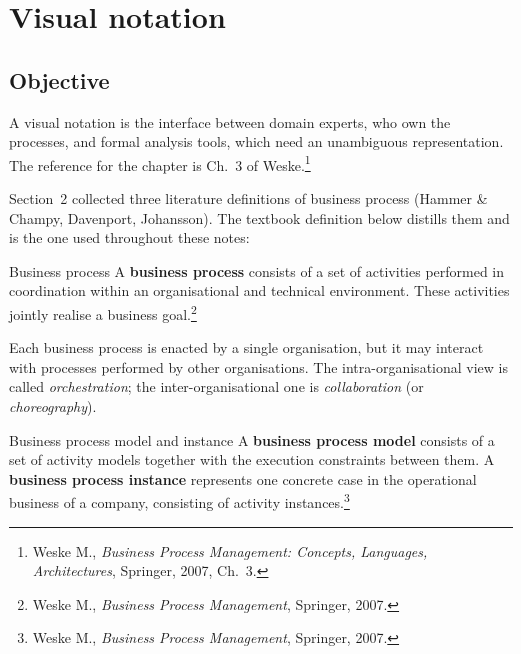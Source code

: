 \section{Visual notation}


\subsection{Objective}

A visual notation is the interface between domain experts, who own the processes, and formal analysis tools, which need an unambiguous representation. The reference for the chapter is Ch.~3 of Weske.\footnote{Weske M., \emph{Business Process Management: Concepts, Languages, Architectures}, Springer, 2007, Ch.~3.}

Section~2 collected three literature definitions of business process (Hammer \& Champy, Davenport, Johansson). The textbook definition below distills them and is the one used throughout these notes:

\begin{definitionbox}{Business process}
A \textbf{business process} consists of a set of activities performed in coordination within an organisational and technical environment. These activities jointly realise a business goal.\footnote{Weske M., \emph{Business Process Management}, Springer, 2007.}
\end{definitionbox}

Each business process is enacted by a single organisation, but it may interact with processes performed by other organisations. The intra-organisational view is called \emph{orchestration}; the inter-organisational one is \emph{collaboration} (or \emph{choreography}).

\begin{definitionbox}{Business process model and instance}
A \textbf{business process model} consists of a set of activity models together with the execution constraints between them. A \textbf{business process instance} represents one concrete case in the operational business of a company, consisting of activity instances.\footnote{Weske M., \emph{Business Process Management}, Springer, 2007.}
\end{definitionbox}

